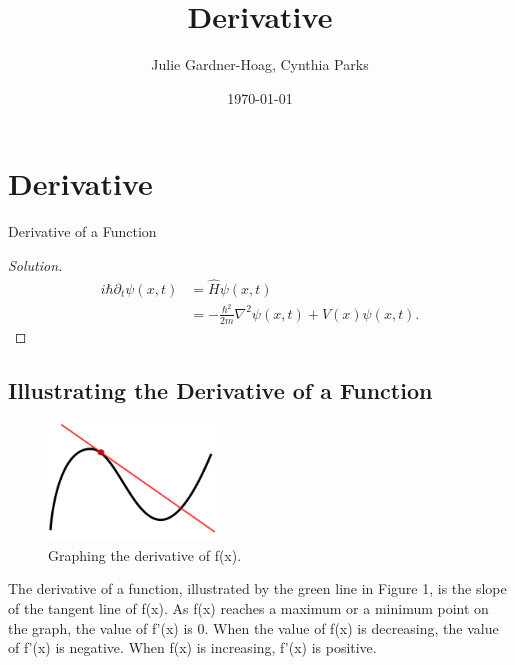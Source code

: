 \documentclass[aps,pra,notitlepage,amsmath,amssymb,letterpaper,12pt]{revtex4-1}
\newenvironment{problem}[2][Problem]{\begin{trivlist}
\item[\hskip \labelsep {\bfseries #1}\hskip \labelsep {\bfseries #2.}]}{\end{trivlist}}
\newenvironment{solution}{\begin{proof}[Solution]}{\end{proof}}
\begin{document}
 
\title{Derivative}
\author{Julie Gardner-Hoag, Cynthia Parks}
\date{\today}

\maketitle

\section{Derivative} %

\begin{problem}{x.yz} 
Derivative of a Function
\end{problem}
 
\begin{solution} %

\begin{align}
i\hbar \partial_t \psi(x,t) &= \hat{H}\psi(x,t) \\
&= -\frac{\hbar^2}{2m}\nabla^2\psi(x,t) + V(x)\psi(x,t). \nonumber
\end{align}
\end{solution}

\subsection{Illustrating the Derivative of a Function} %


\begin{figure}[h!] %
  \includegraphics[width=0.4\textwidth]{derivative.png}  %
  \caption{Graphing the derivative of f(x).}
  \label{fig:figlabel}
\end{figure}

The derivative of a function, illustrated by the green line in Figure 1, is the slope of the tangent line of f(x). As f(x) reaches a maximum or a minimum point on the graph, the value of f'(x) is 0. When the value of f(x) is decreasing, the value of f'(x) is negative. When f(x) is increasing, f'(x) is positive.
\end{document}
